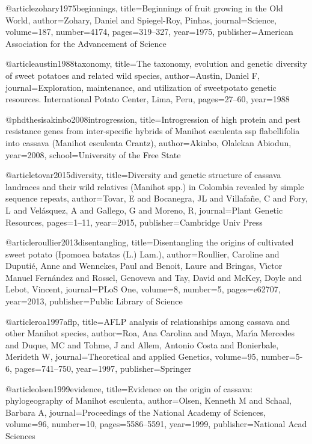 {@article{zohary1975beginnings,
  title={Beginnings of fruit growing in the Old World},
  author={Zohary, Daniel and Spiegel-Roy, Pinhas},
  journal={Science},
  volume={187},
  number={4174},
  pages={319--327},
  year={1975},
  publisher={American Association for the Advancement of Science}
}

@article{austin1988taxonomy,
  title={The taxonomy, evolution and genetic diversity of sweet potatoes and related wild species},
  author={Austin, Daniel F},
  journal={Exploration, maintenance, and utilization of sweetpotato genetic resources. International Potato Center, Lima, Peru},
  pages={27--60},
  year={1988}
}

@phdthesis{akinbo2008introgression,
  title={Introgression of high protein and pest resistance genes from inter-specific hybrids of Manihot esculenta ssp flabellifolia into cassava (Manihot esculenta Crantz)},
  author={Akinbo, Olalekan Abiodun},
  year={2008},
  school={University of the Free State}
}

@article{tovar2015diversity,
  title={Diversity and genetic structure of cassava landraces and their wild relatives (Manihot spp.) in Colombia revealed by simple sequence repeats},
  author={Tovar, E and Bocanegra, JL and Villafa{\~n}e, C and Fory, L and Vel{\'a}squez, A and Gallego, G and Moreno, R},
  journal={Plant Genetic Resources},
  pages={1--11},
  year={2015},
  publisher={Cambridge Univ Press}
}

@article{roullier2013disentangling,
  title={Disentangling the origins of cultivated sweet potato (Ipomoea batatas (L.) Lam.)},
  author={Roullier, Caroline and Duputi{\'e}, Anne and Wennekes, Paul and Benoit, Laure and Bringas, V{\'\i}ctor Manuel Fern{\'a}ndez and Rossel, Genoveva and Tay, David and McKey, Doyle and Lebot, Vincent},
  journal={PLoS One},
  volume={8},
  number={5},
  pages={e62707},
  year={2013},
  publisher={Public Library of Science}
}

@article{roa1997aflp,
  title={AFLP analysis of relationships among cassava and other Manihot species},
  author={Roa, Ana Carolina and Maya, Mar{\'\i}a Mercedes and Duque, MC and Tohme, J and Allem, Antonio Costa and Bonierbale, Merideth W},
  journal={Theoretical and applied Genetics},
  volume={95},
  number={5-6},
  pages={741--750},
  year={1997},
  publisher={Springer}
}

@article{olsen1999evidence,
  title={Evidence on the origin of cassava: phylogeography of Manihot esculenta},
  author={Olsen, Kenneth M and Schaal, Barbara A},
  journal={Proceedings of the National Academy of Sciences},
  volume={96},
  number={10},
  pages={5586--5591},
  year={1999},
  publisher={National Acad Sciences}
}

}
